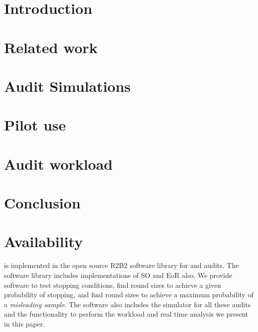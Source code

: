 \section{Introduction}
\label{sec:intro}


\section{Related work}
\label{sec:related}


\section{\Providence}
\label{sec:prov}


\section{\Providence Audit Simulations}
\label{sec:sims}


\section{Pilot use}
\label{sec:pilot}


\section{Audit workload}
\label{sec:workload}


\section{Conclusion}
\label{sec:conc}


\section{Availability}
\label{sec:avail}
\Providence is implemented in the open source R2B2 software library for \R and \B audits.\cite{r2b2} The software library includes implementations of SO and EoR \BRAVO also. We provide software to test stopping conditions, find round sizes to achieve a given probability of stopping, and find round sizes to achieve a maximum probability of a \emph{misleading sample}. The software also includes the simulator for all these audits and the functionality to perform the workload and real time analysis we present in this paper.

